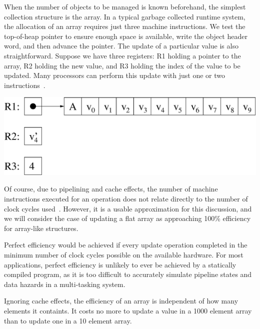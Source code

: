 When the number of objects to be managed is known beforehand, the simplest collection structure is the array. In a typical garbage collected runtime system, the allocation of an array requires just three machine instructions. We test the top-of-heap pointer to ensure enough space is available, write the object header word, and then advance the pointer. The update of a particular value is also straightforward. Suppose we have three registers: R1 holding a pointer to the array, R2 holding the new value, and R3 holding the index of the value to be updated. Many processors can perform this update with just one or two instructions~\cite{sun:sparc-assembly, intel:instruction-set}.

\begin{center}
\includegraphics[scale=0.5]{1-Introduction/fig/destructive/data-array10}
\end{center}

Of course, due to pipelining and cache effects, the number of machine instructions executed for an operation does not relate directly to the number of clock cycles used~\cite{hennessy:computer-architecture}. However, it is a usable approximation for this discussion, and we will consider the case of updating a flat array as approaching 100\% efficiency for array-like structures.

Perfect efficiency would be achieved if every update operation completed in the minimum number of clock cycles possible on the available hardware. For most applications, perfect efficiency is unlikely to ever be achieved by a statically compiled program, as it is too difficult to accurately simulate pipeline states and data hazards in a multi-tasking system. 

Ignoring cache effects, the efficiency of an array is independent of how many elements it containts. It costs no more to update a value in a 1000 element array than to update one in a 10 element array.


